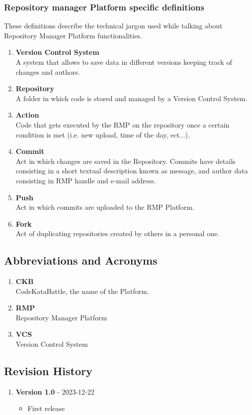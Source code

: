 \subsubsection[short]{Repository manager Platform specific definitions}
These definitions describe the technical jargon used while talking about Repository Manager Platform functionalities.
\begin{enumerate}[label=$\bullet$]
    \item \textbf{Version Control System}\\A system that allows to save data in different versions keeping track of changes and authors.
    \item \textbf{Repository}\\A folder in which code is stored and managed by a Version Control System.
    \item \textbf{Action}\\Code that gets executed by the RMP on the repository once a certain condition is met (i.e. new upload, time of the day, ect...).
    \item \textbf{Commit}\\Act in which changes are saved in the Repository. Commits have details consisting in a short textual description known as message, and author data consisting in RMP handle and e-mail address.
    \item \textbf{Push}\\Act in which commits are uploaded to the RMP Platform.
    \item \textbf{Fork}\\Act of duplicating repositories created by others in a personal one.
\end{enumerate}
\subsection{Abbreviations and Acronyms}
\begin{enumerate}[label=$\bullet$]
    \item \textbf{CKB}\\CodeKataBattle, the name of the Platform.
    \item \textbf{RMP}\\Repository Manager Platform
    \item \textbf{VCS}\\Version Control System
\end{enumerate}

\subsection{Revision History}
\newcommand{\release}[2]{
    \item \textbf{Version #1} - #2
}
\begin{enumerate}[label=$\bullet$]
    \release{1.0}{2023-12-22}
    \begin{itemize}
        \item First release
    \end{itemize}
\end{enumerate}

